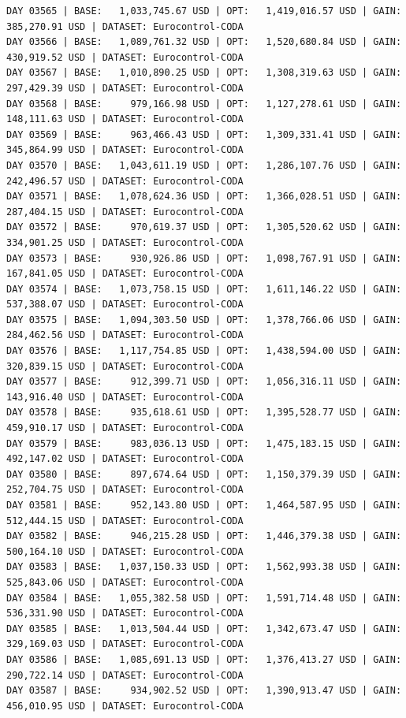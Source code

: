 \documentclass[11pt,a4paper]{article}
\begin{document}
\begin{verbatim}
DAY 03565 | BASE:   1,033,745.67 USD | OPT:   1,419,016.57 USD | GAIN: 385,270.91 USD | DATASET: Eurocontrol-CODA
DAY 03566 | BASE:   1,089,761.32 USD | OPT:   1,520,680.84 USD | GAIN: 430,919.52 USD | DATASET: Eurocontrol-CODA
DAY 03567 | BASE:   1,010,890.25 USD | OPT:   1,308,319.63 USD | GAIN: 297,429.39 USD | DATASET: Eurocontrol-CODA
DAY 03568 | BASE:     979,166.98 USD | OPT:   1,127,278.61 USD | GAIN: 148,111.63 USD | DATASET: Eurocontrol-CODA
DAY 03569 | BASE:     963,466.43 USD | OPT:   1,309,331.41 USD | GAIN: 345,864.99 USD | DATASET: Eurocontrol-CODA
DAY 03570 | BASE:   1,043,611.19 USD | OPT:   1,286,107.76 USD | GAIN: 242,496.57 USD | DATASET: Eurocontrol-CODA
DAY 03571 | BASE:   1,078,624.36 USD | OPT:   1,366,028.51 USD | GAIN: 287,404.15 USD | DATASET: Eurocontrol-CODA
DAY 03572 | BASE:     970,619.37 USD | OPT:   1,305,520.62 USD | GAIN: 334,901.25 USD | DATASET: Eurocontrol-CODA
DAY 03573 | BASE:     930,926.86 USD | OPT:   1,098,767.91 USD | GAIN: 167,841.05 USD | DATASET: Eurocontrol-CODA
DAY 03574 | BASE:   1,073,758.15 USD | OPT:   1,611,146.22 USD | GAIN: 537,388.07 USD | DATASET: Eurocontrol-CODA
DAY 03575 | BASE:   1,094,303.50 USD | OPT:   1,378,766.06 USD | GAIN: 284,462.56 USD | DATASET: Eurocontrol-CODA
DAY 03576 | BASE:   1,117,754.85 USD | OPT:   1,438,594.00 USD | GAIN: 320,839.15 USD | DATASET: Eurocontrol-CODA
DAY 03577 | BASE:     912,399.71 USD | OPT:   1,056,316.11 USD | GAIN: 143,916.40 USD | DATASET: Eurocontrol-CODA
DAY 03578 | BASE:     935,618.61 USD | OPT:   1,395,528.77 USD | GAIN: 459,910.17 USD | DATASET: Eurocontrol-CODA
DAY 03579 | BASE:     983,036.13 USD | OPT:   1,475,183.15 USD | GAIN: 492,147.02 USD | DATASET: Eurocontrol-CODA
DAY 03580 | BASE:     897,674.64 USD | OPT:   1,150,379.39 USD | GAIN: 252,704.75 USD | DATASET: Eurocontrol-CODA
DAY 03581 | BASE:     952,143.80 USD | OPT:   1,464,587.95 USD | GAIN: 512,444.15 USD | DATASET: Eurocontrol-CODA
DAY 03582 | BASE:     946,215.28 USD | OPT:   1,446,379.38 USD | GAIN: 500,164.10 USD | DATASET: Eurocontrol-CODA
DAY 03583 | BASE:   1,037,150.33 USD | OPT:   1,562,993.38 USD | GAIN: 525,843.06 USD | DATASET: Eurocontrol-CODA
DAY 03584 | BASE:   1,055,382.58 USD | OPT:   1,591,714.48 USD | GAIN: 536,331.90 USD | DATASET: Eurocontrol-CODA
DAY 03585 | BASE:   1,013,504.44 USD | OPT:   1,342,673.47 USD | GAIN: 329,169.03 USD | DATASET: Eurocontrol-CODA
DAY 03586 | BASE:   1,085,691.13 USD | OPT:   1,376,413.27 USD | GAIN: 290,722.14 USD | DATASET: Eurocontrol-CODA
DAY 03587 | BASE:     934,902.52 USD | OPT:   1,390,913.47 USD | GAIN: 456,010.95 USD | DATASET: Eurocontrol-CODA

\end{verbatim}
\end{document}
